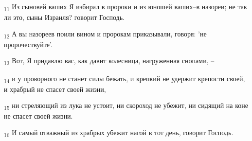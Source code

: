 \begin{tcolorbox}
\textsubscript{11} Из сыновей ваших Я избирал в пророки и из юношей ваших--в назореи; не так ли это, сыны Израиля? говорит Господь.
\end{tcolorbox}
\begin{tcolorbox}
\textsubscript{12} А вы назореев поили вином и пророкам приказывали, говоря: 'не пророчествуйте'.
\end{tcolorbox}
\begin{tcolorbox}
\textsubscript{13} Вот, Я придавлю вас, как давит колесница, нагруженная снопами, --
\end{tcolorbox}
\begin{tcolorbox}
\textsubscript{14} и у проворного не станет силы бежать, и крепкий не удержит крепости своей, и храбрый не спасет своей жизни,
\end{tcolorbox}
\begin{tcolorbox}
\textsubscript{15} ни стреляющий из лука не устоит, ни скороход не убежит, ни сидящий на коне не спасет своей жизни.
\end{tcolorbox}
\begin{tcolorbox}
\textsubscript{16} И самый отважный из храбрых убежит нагой в тот день, говорит Господь.
\end{tcolorbox}
